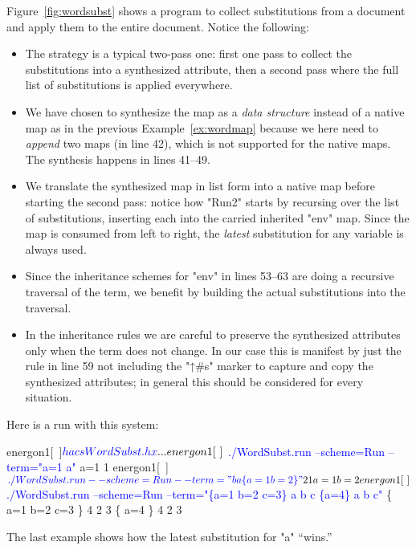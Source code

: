\documentclass[11pt]{article} %
\begin{document}
\begin{example}
  Figure~\ref{fig:wordsubst} shows a \HAX program to collect substitutions from a document and apply
  them to the entire document.  Notice the following:
  \begin{itemize}

  \item The strategy is a typical two-pass one: first one pass to collect the substitutions into a
    synthesized attribute, then a second pass where the full list of substitutions is applied
    everywhere.

  \item We have chosen to synthesize the map as a \emph{data structure} instead of a native \HAX map
    as in the previous Example~\ref{ex:wordmap} because we here need to \emph{append} two maps (in
    line 42), which is not supported for the native maps.  The synthesis happens in lines 41--49.

  \item We translate the synthesized map in list form into a native \HAX map before starting the
    second pass: notice how "Run2" starts by recursing over the list of substitutions, inserting
    each into the carried inherited "env" map.  Since the map is consumed from left to right, the
    \emph{latest} substitution for any variable is always used.

  \item Since the inheritance schemes for "env" in lines 53--63 are doing a recursive traversal of
    the term, we benefit by building the actual substitutions into the traversal.

  \item In the inheritance rules we are careful to preserve the synthesized attributes only when the
    term does not change. In our case this is manifest by just the rule in line 59 not including the
    "↑#s" marker to capture and copy the synthesized attributes; in general this should be
    considered for every situation.

  \end{itemize}
  Here is a run with this system:
\begin{code}[commandchars=\\\{\}]
energon1[~]$ \textcolor{blue}{hacs WordSubst.hx}
...
energon1[~]$ \textcolor{blue}{./WordSubst.run --scheme=Run --term="a=1 a"}
 a=1  1   
energon1[~]$ \textcolor{blue}{./WordSubst.run --scheme=Run --term="b a \{a=1 b=2\}"}
 2  1   {  a=1  b=2    }     
energon1[~]$ \textcolor{blue}{./WordSubst.run --scheme=Run --term="\{a=1 b=2 c=3\} a b c \{a=4\} a b c"}
  \{  a=1  b=2  c=3     \}   4  2  3   \{  a=4   \}   4  2  3         
\end{code}
  The last example shows how the latest substitution for "a" ``wins.''
\end{example}
\end{document}
